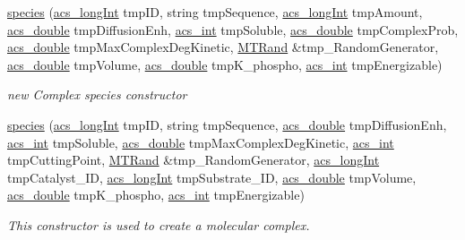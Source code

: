 \begin{DoxyCompactItemize}
\hyperlink{classspecies_a59cb623199b038029a7d63a720408cf5}{species} (\hyperlink{acs__headers_8h_a19319d75f02db4308bc5c0026d98cd85}{acs\-\_\-long\-Int} tmp\-I\-D, string tmp\-Sequence, \hyperlink{acs__headers_8h_a19319d75f02db4308bc5c0026d98cd85}{acs\-\_\-long\-Int} tmp\-Amount, \hyperlink{acs__headers_8h_ab776853a005fcbf56af0424a2a4dd607}{acs\-\_\-double} tmp\-Diffusion\-Enh, \hyperlink{acs__headers_8h_a8d277355641a098190360234e2ebde35}{acs\-\_\-int} tmp\-Soluble, \hyperlink{acs__headers_8h_ab776853a005fcbf56af0424a2a4dd607}{acs\-\_\-double} tmp\-Complex\-Prob, \hyperlink{acs__headers_8h_ab776853a005fcbf56af0424a2a4dd607}{acs\-\_\-double} tmp\-Max\-Complex\-Deg\-Kinetic, \hyperlink{class_m_t_rand}{M\-T\-Rand} \&tmp\-\_\-\-Random\-Generator, \hyperlink{acs__headers_8h_ab776853a005fcbf56af0424a2a4dd607}{acs\-\_\-double} tmp\-Volume, \hyperlink{acs__headers_8h_ab776853a005fcbf56af0424a2a4dd607}{acs\-\_\-double} tmp\-K\-\_\-phospho, \hyperlink{acs__headers_8h_a8d277355641a098190360234e2ebde35}{acs\-\_\-int} tmp\-Energizable)
\begin{DoxyCompactList}\small\item\em new Complex species constructor \end{DoxyCompactList}\item 
\hyperlink{classspecies_ae0502a70e156c48b917ef2dadf72a859}{species} (\hyperlink{acs__headers_8h_a19319d75f02db4308bc5c0026d98cd85}{acs\-\_\-long\-Int} tmp\-I\-D, string tmp\-Sequence, \hyperlink{acs__headers_8h_ab776853a005fcbf56af0424a2a4dd607}{acs\-\_\-double} tmp\-Diffusion\-Enh, \hyperlink{acs__headers_8h_a8d277355641a098190360234e2ebde35}{acs\-\_\-int} tmp\-Soluble, \hyperlink{acs__headers_8h_ab776853a005fcbf56af0424a2a4dd607}{acs\-\_\-double} tmp\-Max\-Complex\-Deg\-Kinetic, \hyperlink{acs__headers_8h_a8d277355641a098190360234e2ebde35}{acs\-\_\-int} tmp\-Cutting\-Point, \hyperlink{class_m_t_rand}{M\-T\-Rand} \&tmp\-\_\-\-Random\-Generator, \hyperlink{acs__headers_8h_a19319d75f02db4308bc5c0026d98cd85}{acs\-\_\-long\-Int} tmp\-Catalyst\-\_\-\-I\-D, \hyperlink{acs__headers_8h_a19319d75f02db4308bc5c0026d98cd85}{acs\-\_\-long\-Int} tmp\-Substrate\-\_\-\-I\-D, \hyperlink{acs__headers_8h_ab776853a005fcbf56af0424a2a4dd607}{acs\-\_\-double} tmp\-Volume, \hyperlink{acs__headers_8h_ab776853a005fcbf56af0424a2a4dd607}{acs\-\_\-double} tmp\-K\-\_\-phospho, \hyperlink{acs__headers_8h_a8d277355641a098190360234e2ebde35}{acs\-\_\-int} tmp\-Energizable)
\begin{DoxyCompactList}\small\item\em This constructor is used to create a molecular complex. \end{DoxyCompactList}\item 

\end{DoxyCompactItemize}

